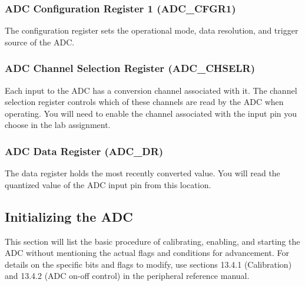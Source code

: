 \documentclass[11pt,fleqn]{book} %
\begin{document}
\subsubsection{ADC Configuration Register 1 (ADC\_CFGR1)}
The configuration register sets the operational mode, data resolution, and trigger source of the ADC. 

\subsubsection{ADC Channel Selection Register (ADC\_CHSELR)}
Each input to the ADC has a conversion channel associated with it. The channel selection register controls which of these channels are read by the ADC when operating. You will need to enable the channel associated with the input pin you choose in the lab assignment. 

\subsubsection{ADC Data Register (ADC\_DR)}
The data register holds the most recently converted value. You will read the quantized value of the ADC input pin from this location. 

\subsection{Initializing the ADC}
This section will list the basic procedure of calibrating, enabling, and starting the ADC without mentioning the actual flags and conditions for advancement. For details on the specific bits and flags to modify, use sections 13.4.1 (Calibration) and 13.4.2 (ADC on-off control) in the peripheral reference manual.
\end{document}
